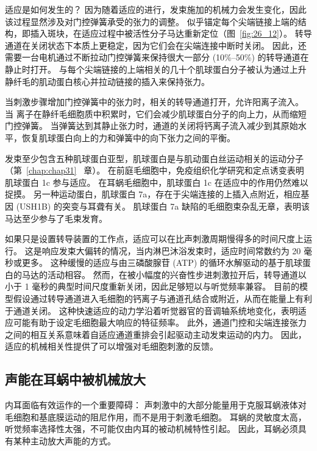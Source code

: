 适应是如何发生的？
因为随着适应的进行，发束施加的机械力会发生变化，因此该过程显然涉及对门控弹簧承受的张力的调整。
似乎锚定每个尖端链接上端的结构，即插入斑块，在适应过程中被活性分子马达重新定位（图~\ref{fig:26_12}）。
转导通道在关闭状态下本质上更稳定，因为它们会在尖端连接中断时关闭。
因此，还需要一台电机通过不断拉动门控弹簧来保持很大一部分 (10\%–50\%) 的转导通道在静止时打开。
与每个尖端链接的上端相关的几十个肌球蛋白分子被认为通过上升静纤毛的肌动蛋白核心并拉动链接的插入来保持张力。


当刺激步骤增加门控弹簧中的张力时，相关的转导通道打开，允许阳离子流入。
当  离子在静纤毛细胞质中积累时，它们会减少肌球蛋白分子的向上力，从而缩短门控弹簧。
当弹簧达到其静止张力时，通道的关闭将钙离子流入减少到其原始水平，恢复肌球蛋白向上的力和弹簧中的向下张力之间的平衡。


发束至少包含五种肌球蛋白亚型，肌球蛋白是与肌动蛋白丝运动相关的运动分子（第~\ref{chap:chap31}~ 章）。
在前庭毛细胞中，免疫组织化学研究和定点诱变表明肌球蛋白 1c 参与适应。
在耳蜗毛细胞中，肌球蛋白 1c 在适应中的作用仍然难以捉摸。
另一种运动蛋白，肌球蛋白 7a，存在于尖端连接的上插入点附近，相应基因 (USH1B) 的突变与耳聋有关。
肌球蛋白 7a 缺陷的毛细胞束杂乱无章，表明该马达至少参与了毛束发育。


如果只是设置转导装置的工作点，适应可以在比声刺激周期慢得多的时间尺度上运行。
这是响应发束大偏转的情况，当内淋巴沐浴发束时，适应时间常数约为 20 毫秒或更多。
这种缓慢的适应与由三磷酸腺苷 (ATP) 的循环水解驱动的基于肌球蛋白的马达的活动相容。
然而，在被小幅度的兴奋性步进刺激拉开后，转导通道以小于 1 毫秒的典型时间尺度重新关闭，因此足够短以与听觉频率兼容。
目前的模型假设通过转导通道进入毛细胞的钙离子与通道孔结合或附近，从而在能量上有利于通道关闭。
这种快速适应的动力学沿着听觉器官的音调轴系统地变化，表明适应可能有助于设定毛细胞最大响应的特征频率。
此外，通道门控和尖端连接张力之间的相互关系意味着自适应通道重排会引起驱动主动发束运动的内力。
因此，适应的机械相关性提供了可以增强对毛细胞刺激的反馈。


\subsection{声能在耳蜗中被机械放大}

内耳面临有效运作的一个重要障碍：
声刺激中的大部分能量用于克服耳蜗液体对毛细胞和基底膜运动的阻尼作用，而不是用于刺激毛细胞。
耳蜗的灵敏度太高，听觉频率选择性太强，不可能仅由内耳的被动机械特性引起。
因此，耳蜗必须具有某种主动放大声能的方式。


